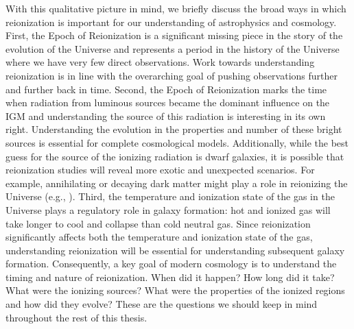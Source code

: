 With this qualitative picture in mind, we briefly discuss the broad ways in which reionization is important for our understanding of astrophysics and cosmology. First, the Epoch of Reionization is a significant missing piece in the story of the evolution of the Universe and represents a period in the history of the Universe where we have very few direct observations. Work towards understanding reionization is in line with the overarching goal of pushing observations further and further back in time. Second, the Epoch of Reionization marks the time when radiation from luminous sources became the dominant influence on the IGM and understanding the source of this radiation is interesting in its own right. Understanding the evolution in the properties and number of these bright sources is essential for complete cosmological models. Additionally, while the best guess for the source of the ionizing radiation is dwarf galaxies, it is possible that reionization studies will reveal more exotic and unexpected scenarios. For example, annihilating or decaying dark matter might play a role in reionizing the Universe (e.g., \citealt{kasuya2004early,mapelli2006impact,pierpaoli2004decaying}). Third, the temperature and ionization state of the gas in the Universe plays a regulatory role in galaxy formation: hot and ionized gas will take longer to cool and collapse than cold neutral gas. Since reionization significantly affects both the temperature and ionization state of the gas, understanding reionization will be essential for understanding subsequent galaxy formation. Consequently, a key goal of modern cosmology is to understand the timing and nature of reionization. When did it happen? How long did it take? What were the ionizing sources? What were the properties of the ionized regions and how did they evolve? These are the questions we should keep in mind throughout the rest of this thesis.

